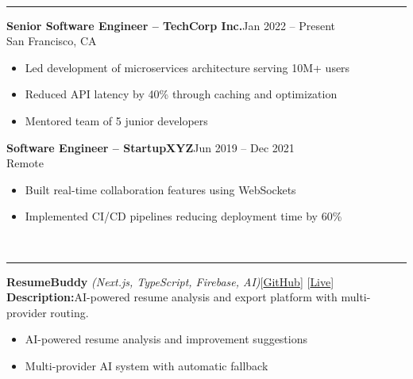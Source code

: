 \documentclass[letterpaper,11pt]{article}
\begin{document}
\par
{}\\
\vspace{2pt}\hrule\vspace{4pt}
\textbf{Senior Software Engineer -- TechCorp Inc.}\hfill Jan 2022 -- Present\\
\small San Francisco, CA\normalsize\\
\begin{itemize}
  \item Led development of microservices architecture serving 10M+ users
  \item Reduced API latency by 40\% through caching and optimization
  \item Mentored team of 5 junior developers
\end{itemize}
\par\vspace{3pt}
\textbf{Software Engineer -- StartupXYZ}\hfill Jun 2019 -- Dec 2021\\
\small Remote\normalsize\\
\begin{itemize}
  \item Built real-time collaboration features using WebSockets
  \item Implemented CI/CD pipelines reducing deployment time by 60\%
\end{itemize}
\par\vspace{3pt}
\par\vspace{6pt}
\par
{}\\
\vspace{2pt}\hrule\vspace{4pt}
\textbf{ResumeBuddy} \textit{(Next.js, TypeScript, Firebase, AI)}\hfill {\color{cyan}[\href{\detokenize{https://github.com/example/resumebuddy}}{GitHub}]} {\color{cyan}[\href{\detokenize{https://resumebuddy.app}}{Live}]}\\
\textbf{Description:}\quad AI-powered resume analysis and export platform with multi-provider routing.\\
\begin{itemize}
  \item AI-powered resume analysis and improvement suggestions
  \item Multi-provider AI system with automatic fallback
\end{itemize}
\end{document}
